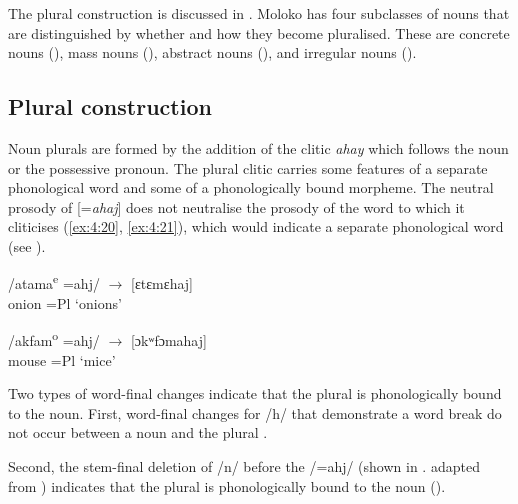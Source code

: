 The plural construction is discussed in . Moloko has four subclasses of nouns that are distinguished by whether and how they become pluralised. These are concrete nouns (), mass nouns (), abstract nouns (), and irregular nouns (). 

\subsection{Plural construction}\label{sec:4.2.2}
\hypertarget{RefHeading1211421525720847}{}
Noun plurals are formed by the addition of the clitic \textit{ahay} which follows the noun or the possessive pronoun. The plural clitic carries some features of a separate phonological word and some of a phonologically bound morpheme. The neutral prosody of [=\textit{ahaj}] does not neutralise the prosody of the word to which it cliticises (\ref{ex:4:20}, \ref{ex:4:21}), which would indicate a separate phonological word (see ). 


\ea \label{ex:4:20}
 \textup{/atama\textsuperscript{e}} \textup{=ahj/  \hspace{20pt}  $\rightarrow$ \hspace{10pt}  [ɛtɛmɛhaj]}\\
  onion \hspace{8pt}    =Pl     \hspace{60pt}      ‘onions’\\
\z

\ea \label{ex:4:21}
\textup{/akfam\textsuperscript{o}} \textup{=ahj/} \hspace{15pt}   $\rightarrow$ \hspace{10pt} \textup{[}\textup{ɔkʷfɔmahaj]}\\
\glt  mouse \hspace{6pt}  =Pl  \hspace{60pt}      ‘mice’
\z

Two types of word-final changes indicate that the plural is phonologically bound to the noun. First, word-final changes for /h/ that demonstrate a word break do not occur between a noun and the plural . 

Second, the stem-final deletion of /n/ before the /=ahj/ (shown in . adapted from \citealt{Bow1997c}) indicates that the plural is phonologically bound to the noun (). 


